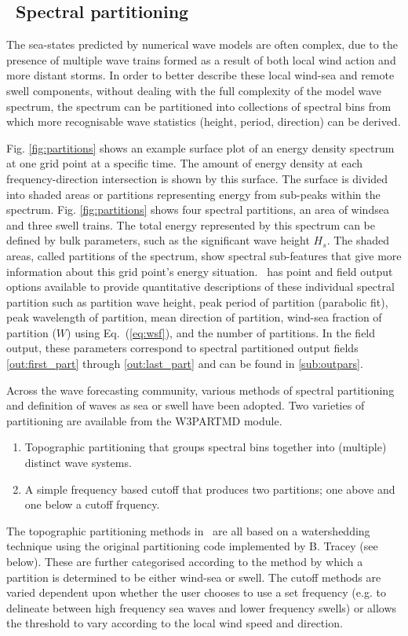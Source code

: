 \vssub
\subsection{~Spectral partitioning} \label{sub:num_part}

The sea-states predicted by numerical wave models are often complex, due to the
presence of multiple wave trains formed as a result of both local wind action and
more distant storms. In order to better describe these local wind-sea and remote
swell components, without dealing with the full complexity of the model wave spectrum,
the spectrum can be partitioned into collections of spectral bins from which more
recognisable wave statistics (height, period, direction) can be derived. 

\noindent
Fig. \ref{fig:partitions} shows an example surface plot of an energy density
spectrum at one grid point at a specific time.  The amount of energy density
at each frequency-direction intersection is shown by this surface.  The
surface is divided into shaded areas or partitions representing energy from
sub-peaks within the spectrum.  Fig. \ref{fig:partitions} shows four
spectral partitions, an area of windsea and three swell trains.  The total
energy represented by this spectrum can be defined by bulk parameters, such as
the significant wave height $H_s$. The shaded areas, called partitions of the
spectrum, show spectral sub-features that give more information about this
grid point's energy situation.  \ws\ has point and field output options
available to provide quantitative descriptions of these individual spectral
partition such as partition wave height, peak period of partition (parabolic
fit), peak wavelength of partition, mean direction of partition, wind-sea
fraction of partition ($W$) using Eq.~(\ref{eq:wsf}), and the number of
partitions.  In the field output, these parameters correspond to spectral partitioned output fields 
\ref{out:first_part} through \ref{out:last_part} and can be found in
\para\ref{sub:outpars}.

Across the wave forecasting community, various methods of spectral partitioning
and definition of waves as sea or swell have been adopted. Two varieties of partitioning
are available from the W3PARTMD module.
\begin{enumerate}
  \item Topographic partitioning that groups spectral bins together into (multiple) 
        distinct wave systems.
  \item A simple frequency based cutoff that produces two partitions; one above
        and one below a cutoff frquency.
\end{enumerate}
The topographic partitioning methods in \ws\ are all based on a watershedding technique
using the original partitioning code implemented by B. Tracey (see below). These are
further categorised according to the method by which a partition is determined to be
either wind-sea or swell. The cutoff methods are varied dependent upon whether the
user chooses to use a set frequency (e.g. to delineate between high frequency sea waves 
and lower frequency swells) or allows the threshold to vary according to the
local wind speed and direction.

